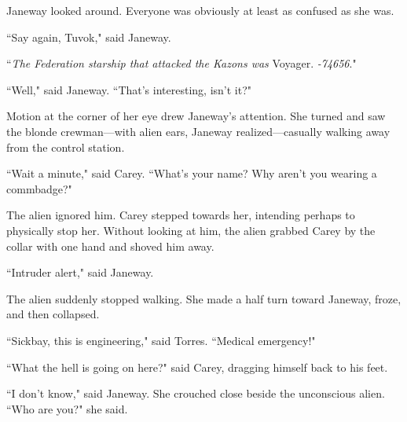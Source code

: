 \documentclass[twoside,letterpaper,12pt]{memoir}
\begin{document}
Janeway looked around. Everyone was obviously at least as confused as she was.

``Say again, Tuvok," said Janeway.

``\textit{The Federation starship that attacked the Kazons was}  Voyager. \textit{-74656}."

``Well," said Janeway. ``That's interesting, isn't it?"

Motion at the corner of her eye drew Janeway's attention. She turned and saw the blonde crewman---with alien ears, Janeway realized---casually walking away from the control station.

``Wait a minute," said Carey. ``What's your name? Why aren't you wearing a commbadge?"

The alien ignored him. Carey stepped towards her, intending perhaps to physically stop her. Without looking at him, the alien grabbed Carey by the collar with one hand and shoved him away.

``Intruder alert," said Janeway.

The alien suddenly stopped walking. She made a half turn toward Janeway, froze, and then collapsed.

``Sickbay, this is engineering," said Torres. ``Medical emergency!"

``What the hell is going on here?" said Carey, dragging himself back to his feet.

``I don't know," said Janeway. She crouched close beside the unconscious alien. ``Who are you?" she said.
\end{document}
